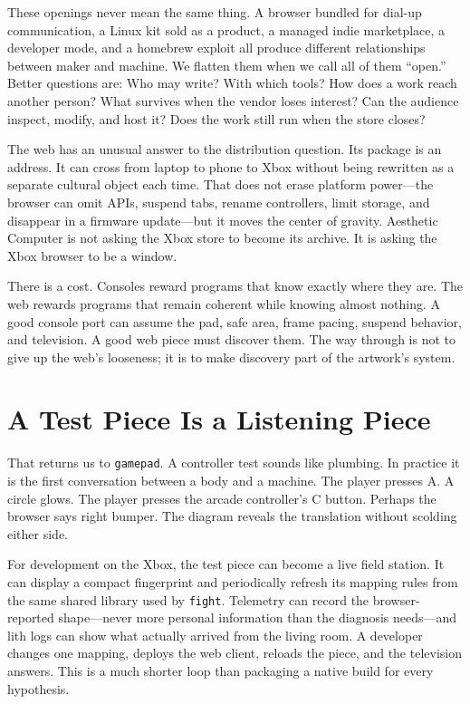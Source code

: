 \documentclass[11pt,letterpaper]{article}
\begin{document}
These openings never mean the same thing. A browser bundled for dial-up communication, a Linux kit sold as a product, a managed indie marketplace, a developer mode, and a homebrew exploit all produce different relationships between maker and machine. We flatten them when we call all of them ``open.'' Better questions are: Who may write? With which tools? How does a work reach another person? What survives when the vendor loses interest? Can the audience inspect, modify, and host it? Does the work still run when the store closes?

The web has an unusual answer to the distribution question. Its package is an address. It can cross from laptop to phone to Xbox without being rewritten as a separate cultural object each time. That does not erase platform power---the browser can omit APIs, suspend tabs, rename controllers, limit storage, and disappear in a firmware update---but it moves the center of gravity. Aesthetic Computer is not asking the Xbox store to become its archive. It is asking the Xbox browser to be a window.

There is a cost. Consoles reward programs that know exactly where they are. The web rewards programs that remain coherent while knowing almost nothing. A good console port can assume the pad, safe area, frame pacing, suspend behavior, and television. A good web piece must discover them. The way through is not to give up the web's looseness; it is to make discovery part of the artwork's system.

\section{A Test Piece Is a Listening Piece}

That returns us to \texttt{gamepad}. A controller test sounds like plumbing. In practice it is the first conversation between a body and a machine. The player presses A. A circle glows. The player presses the arcade controller's C button. Perhaps the browser says right bumper. The diagram reveals the translation without scolding either side.

For development on the Xbox, the test piece can become a live field station. It can display a compact fingerprint and periodically refresh its mapping rules from the same shared library used by \texttt{fight}. Telemetry can record the browser-reported shape---never more personal information than the diagnosis needs---and lith logs can show what actually arrived from the living room. A developer changes one mapping, deploys the web client, reloads the piece, and the television answers. This is a much shorter loop than packaging a native build for every hypothesis.
\end{document}
